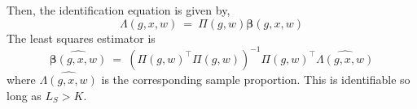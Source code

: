\documentclass[11pt]{article}
\theoremstyle{plain}
\newcommand\spacingset[1]{\renewcommand{\baselinestretch}%
  {#1}\small\normalsize}
\newcommand{\bbeta}{\bm{\beta}}
\begin{document}
Then, the identification equation is given by,
\begin{equation}
  \Lambda(g,x,w) \ = \ \Pi(g,w) \bbeta(g,x,w)
\end{equation}
The least squares estimator is
\begin{equation}
  \widehat{\bbeta(g,x,w)} \ = \ \left(\Pi(g,w)^\top\Pi(g,w)\right)^{-1} \Pi(g,w)^\top \widehat{\Lambda(g,x,w)}
\end{equation}
where $\widehat{\Lambda(g,x,w)}$ is the corresponding sample
proportion. This is identifiable so long as $L_S > K$.
    
\spacingset{1.5}

\end{document}
